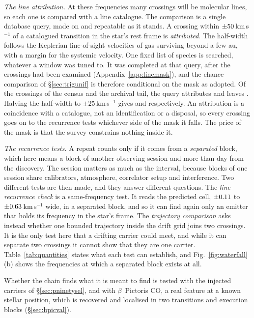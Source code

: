 \emph{The line attribution.} At these frequencies many crossings will be
molecular lines, so each one is compared with a line catalogue. The
comparison is a single database query, made on \MkListDate{} and repeatable
as it stands. A crossing within $\pm50$\,km\,s$^{-1}$ of a
catalogued transition in the star's rest frame is \emph{attributed}. The
half-width follows the Keplerian line-of-sight velocities of gas surviving
beyond a few au, with a margin for the systemic velocity. One fixed list of
\FrNSpec{} species is searched, whatever a window was tuned to. It was
completed at that query, after the crossings had been examined
(Appendix~\ref{app:linemask}), and the chance comparison of
\S\ref{sec:trigunif} is therefore conditional on the mask as adopted. Of the
\CnCross{} crossings of the census and the archival tail, the query attributes
\FrAttrWFifty{} and leaves \FrUnattrWFifty. Halving the half-width to
$\pm25$\,km\,s$^{-1}$ gives \FrAttrWTwentyFive{} and \FrUnattrWTwentyFive{}
respectively.
An attribution is a coincidence with a catalogue, not an identification or a
disposal, so every crossing goes on to the recurrence tests whichever side of
the mask it falls. The price of the mask is that the survey constrains
nothing inside it.

\emph{The recurrence tests.} A repeat counts only if it comes from a
\emph{separated} block, which here means a block of another observing session
and more than \EpSep{} day from the discovery. The session matters as much as
the interval, because blocks of one session share calibrators, atmosphere,
correlator setup and interference. Two different tests are then made, and
they answer different questions. The \emph{line-recurrence check} is a
same-frequency test. It reads the predicted cell, $\pm0.11$ to
$\pm0.63$\,km\,s$^{-1}$ wide, in a separated block, and so it can find
again only an emitter that holds its frequency in the star's frame. The
\emph{trajectory comparison} asks instead whether one bounded trajectory
inside the drift grid joins two crossings. It is the only test here that a
drifting carrier could meet, and while it can separate two crossings it
cannot show that they are one carrier. Table~\ref{tab:quantities} states what
each test can establish, and Fig.~\ref{fig:waterfall}(b) shows the frequencies
at which a separated block exists at all.

Whether the chain finds what it is meant to find is tested with the injected
carriers of \S\ref{sec:pninetysel}, and with $\beta$~Pictoris CO, a real
feature at a known stellar position, which is recovered and localised in two
transitions and \CsBpCoBlocks{} execution blocks (\S\ref{sec:bpicval}).


